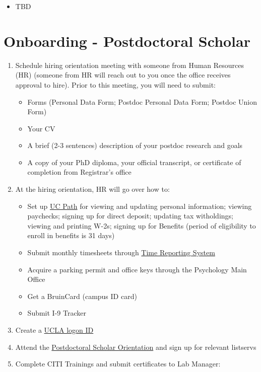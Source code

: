 \documentclass[]{book}
\providecommand{\tightlist}{%
  \setlength{\itemsep}{0pt}\setlength{\parskip}{0pt}}
\begin{document}
\begin{itemize}
\tightlist
\item
  TBD
\end{itemize}

\section{Onboarding - Postdoctoral
Scholar}\label{onboarding---postdoctoral-scholar}

\begin{enumerate}
\def\labelenumi{\arabic{enumi}.}
\item
  Schedule hiring orientation meeting with someone from Human Resources
  (HR) (someone from HR will reach out to you once the office receives
  approval to hire). Prior to this meeting, you will need to submit:

  \begin{itemize}
  \tightlist
  \item
    Forms (Personal Data Form; Postdoc Personal Data Form; Postdoc Union
    Form)
  \item
    Your CV
  \item
    A brief (2-3 sentences) description of your postdoc research and
    goals
  \item
    A copy of your PhD diploma, your official transcript, or certificate
    of completion from Registrar's office
  \end{itemize}
\item
  At the hiring orientation, HR will go over how to:

  \begin{itemize}
  \tightlist
  \item
    Set up \href{https://ucpath.universityofcalifornia.edu/}{UC Path}
    for viewing and updating personal information; viewing paychecks;
    signing up for direct deposit; updating tax witholdings; viewing and
    printing W-2s; signing up for Benefits (period of eligibility to
    enroll in benefits is 31 days)
  \item
    Submit monthly timesheets through
    \href{https://uctrs.it.ucla.edu/}{Time Reporting System}
  \item
    Acquire a parking permit and office keys through the Psychology Main
    Office
  \item
    Get a BruinCard (campus ID card)
  \item
    Submit I-9 Tracker
  \end{itemize}
\item
  Create a \href{https://accounts.iam.ucla.edu/\#/}{UCLA logon ID}
\item
  Attend the
  \href{https://www.postdoc.ucla.edu/resources/new-postdocs/}{Postdoctoral
  Scholar Orientation} and sign up for relevant listservs
\item
  Complete CITI Trainings and submit certificates to Lab Manager:


\end{enumerate}
\end{document}
